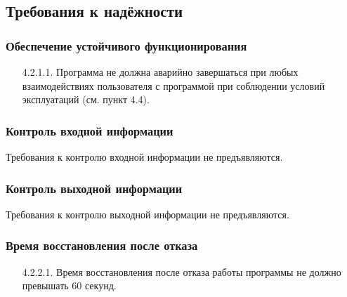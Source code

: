 \subsection{Требования к надёжности}

\subsubsection{Обеспечение устойчивого функционирования}

\begin{enumerate}
    \item[4.2.1.1.] {Программа не должна аварийно завершаться при любых взаимодействиях пользователя с программой при соблюдении условий эксплуатаций (см. пункт 4.4).}
\end{enumerate}

\subsubsection{Контроль входной информации}

Требования к контролю входной информации не предъявляются.

\subsubsection{Контроль выходной информации}

Требования к контролю выходной информации не предъявляются.

\subsubsection{Время восстановления после отказа}

\begin{enumerate}
    \item[4.2.2.1.] {Время восстановления после отказа работы программы не должно превышать 60 секунд.} 
\end{enumerate}